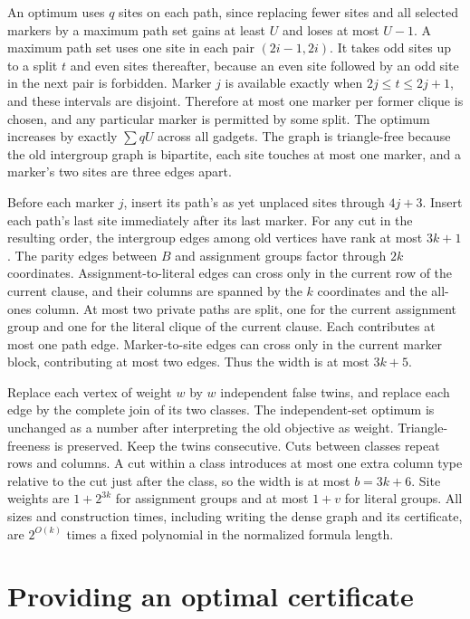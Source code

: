 \documentclass[11pt]{article}
\begin{document}
An optimum uses \(q\) sites on each path, since replacing fewer
sites and all selected markers by a maximum path set gains at
least \(U\) and loses at most \(U-1\). A maximum path set uses one
site in each pair \((2i-1,2i)\). It takes odd sites up to a split
\(t\) and even sites thereafter, because an even site followed
by an odd site in the next pair is forbidden. Marker \(j\) is
available exactly when \(2j\le t\le 2j+1\), and these intervals
are disjoint. Therefore at most one marker per former clique is
chosen, and any particular marker is permitted by some split.
The optimum increases by exactly \(\sum qU\) across all gadgets.
The graph is triangle-free because the old intergroup graph is
bipartite, each site touches at most one marker, and a marker's
two sites are three edges apart.

Before each marker \(j\), insert its path's as yet unplaced sites
through \(4j+3\). Insert each path's last site immediately after its
last marker.
For any cut in the resulting order, the intergroup edges among
old vertices have rank at most \(3k+1\). The parity edges between
\(B\) and assignment groups factor through \(2k\) coordinates.
Assignment-to-literal edges can cross only in the current row of
the current clause, and their columns are spanned by the \(k\)
coordinates and the all-ones column. At most two private paths
are split, one for the current assignment group and one for the
literal clique of the current clause. Each contributes at most
one path edge. Marker-to-site edges can cross only in the current
marker block, contributing at most two edges. Thus the width is
at most \(3k+5\).

Replace each vertex of weight \(w\) by \(w\) independent false twins,
and replace each edge by the complete join of its two classes.
The independent-set optimum is unchanged as a number after
interpreting the old objective as weight. Triangle-freeness is
preserved. Keep the twins consecutive. Cuts between classes repeat
rows and columns. A cut within a class introduces at most one
extra column type relative to the cut just after the class, so
the width is at most \(b=3k+6\). Site weights are \(1+2^{3k}\)
for assignment groups and at most \(1+v\) for literal groups.
All sizes and construction times, including writing the dense
graph and its certificate, are \(2^{O(k)}\) times a fixed polynomial
in the normalized formula length.

\section{Providing an optimal certificate}
\end{document}
